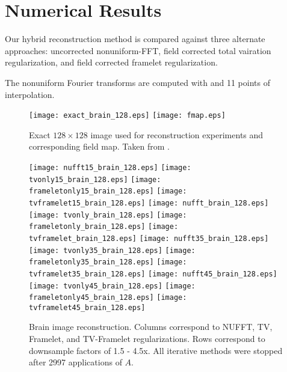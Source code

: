 \documentclass[11pt]{amsart}
\theoremstyle{remark}
\begin{document}
\section{Numerical Results}

Our hybrid reconstruction method is compared against three alternate approaches: uncorrected nonuniform-FFT, field corrected total vairation regularization, and field corrected framelet regularization.

The nonuniform Fourier transforms are computed with \cite{Fessler2003} and 11 points of interpolation. 

\begin{center}
\begin{figure}[h!]
\texttt{[image: exact\_brain\_128.eps]}
\texttt{[image: fmap.eps]}
\caption{Exact $128 \times 128$ image used for reconstruction experiments and corresponding field map. Taken from \cite{Fessler2003}.}
\end{figure}
\end{center}

\begin{center}
\begin{figure}[h!]
\texttt{[image: nufft15\_brain\_128.eps]}
\texttt{[image: tvonly15\_brain\_128.eps]}
\texttt{[image: frameletonly15\_brain\_128.eps]}
\texttt{[image: tvframelet15\_brain\_128.eps]}
\linebreak
\texttt{[image: nufft\_brain\_128.eps]}
\texttt{[image: tvonly\_brain\_128.eps]}
\texttt{[image: frameletonly\_brain\_128.eps]}
\texttt{[image: tvframelet\_brain\_128.eps]}
\linebreak
\texttt{[image: nufft35\_brain\_128.eps]}
\texttt{[image: tvonly35\_brain\_128.eps]}
\texttt{[image: frameletonly35\_brain\_128.eps]}
\texttt{[image: tvframelet35\_brain\_128.eps]}
\linebreak
\texttt{[image: nufft45\_brain\_128.eps]}
\texttt{[image: tvonly45\_brain\_128.eps]}
\texttt{[image: frameletonly45\_brain\_128.eps]}
\texttt{[image: tvframelet45\_brain\_128.eps]}
\caption{Brain image reconstruction. Columns correspond to NUFFT, TV, Framelet, and TV-Framelet regularizations. Rows correspond to downsample factors of 1.5 - 4.5x. All iterative methods were stopped after 2997 applications of $A$.}
\end{figure}
\end{center}
\end{document}
